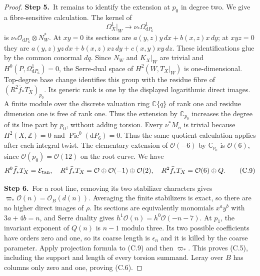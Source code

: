 \documentclass[11pt,a4paper]{article}
\theoremstyle{plain}
\theoremstyle{definition}
\begin{document}
\begin{proof}
\par\smallskip\noindent\textbf{Step 5.}\ It remains to identify the extension at $p_0$ in degree two. We give
a fibre-sensitive calculation. The kernel of
\[
 \Omega_X^1|_W\longrightarrow\nu_*\Omega_{\mathrm dP_6}^1
\]
is $\nu_*\mathcal O_{\mathrm dP_6}\otimes N_W^*$. At $xy=0$ its sections are
$a(y,z)y\,dx+b(x,z)x\,dy$; at $xyz=0$ they are
$a(y,z)yz\,dx+b(x,z)xz\,dy+c(x,y)xy\,dz$.
These identifications glue by the common conormal $dq$.
Since $N_W$ and $K_X|_W$ are trivial and $H^0(P,\Omega_{\mathrm dP_6}^1)=0$, the
Serre-dual space of $H^2(W,T_X|_W)$ is one-dimensional.
Top-degree base change identifies this group with the residue fibre
of $(R^2\bar f_*T_X)_{p_0}$. Its generic rank is one by the displayed logarithmic direct images.
A finite module over the discrete valuation ring $\mathbb C\{q\}$ of rank
one and residue dimension one is free of rank one. Thus the extension
by $\mathbb C_{p_0}$ increases the degree of its line part by $p_0$, without
adding torsion. 
Every $\nu^*M_n$ is trivial because $H^2(X,\mathbb Z)=0$ and
$\operatorname{Pic}^0(\mathrm dP_6)=0$. Thus the same quotient
calculation applies after each integral twist. The elementary extension
of $\mathcal O(-6)$ by $\mathbb C_{p_0}$ is $\mathcal O(6)$,
since $\mathcal O(p_0)=\mathcal O(12)$ on the root curve.
We have
\[
 R^0\bar f_*T_X=\mathcal E_{\rm tan},\quad
 R^1\bar f_*T_X=\mathcal O\oplus\mathcal O(-1)\oplus\mathcal O(2),\quad
 R^2\bar f_*T_X=\mathcal O(6)\oplus Q.                       \tag{C.9}
\]

\par\smallskip\noindent\textbf{Step 6.}\ For a root line, removing its two stabilizer characters gives
$\varpi_*\mathcal O(n)=\mathcal O_B(d(n))$. Averaging the finite stabilizers is exact, so there are no higher direct images of $\rho$. Its sections are equivalently monomials $x^ay^b$ with $3a+4b=n$, and Serre duality gives $h^1\mathcal O(n)=h^0\mathcal O(-n-7)$. At $p_1$, the invariant exponent of $Q(n)$ is $n-1$ modulo three. Its two possible coefficients have orders zero and one, so its coarse length is $\epsilon_n$ and it is killed by the coarse parameter. Apply projection formula to (C.9) and then $\varpi_*$. This proves (C.5), including the support and length of every torsion summand. Leray over $B$ has columns only zero and one, proving (C.6).


\end{proof}
\end{document}
